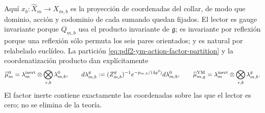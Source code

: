 Aquí $x_b:\widehat X_m\to X_{m,b}$ es la proyección de coordenadas del
collar, de modo que dominio, acción y codominio de cada sumando quedan fijados.
El lector es gauge invariante porque $Q_{m,b}$ usa el producto invariante de
$\mathfrak g$; es invariante por reflexión porque una reflexión sólo permuta los
seis pares orientados; y es natural por relabelado euclídeo.
La partición \eqref{eq:pdf2-ym-action-factor-partition} y la coordenatización producto dan
explícitamente
\begin{equation}\label{eq:pdf2-ym-action-factor-measures}
 \widehat\mu_m^0=\lambda_m^{\rm inert}\otimes
   \bigotimes_{r,b}\lambda_{m,b}^0,
 \qquad
 d\lambda_{m,b}^g
 :=(Z_{m,b}^g)^{-1}e^{-p_{m,b}/(4g^2)}d\lambda_{m,b}^0,
 \qquad
 \widehat\mu_{m,g}^{\rm YM}=\lambda_m^{\rm inert}\otimes
   \bigotimes_{r,b}\lambda_{m,b}^g.
\end{equation}
El factor inerte contiene exactamente las coordenadas sobre las que el lector es
cero; no se elimina de la teoría.

